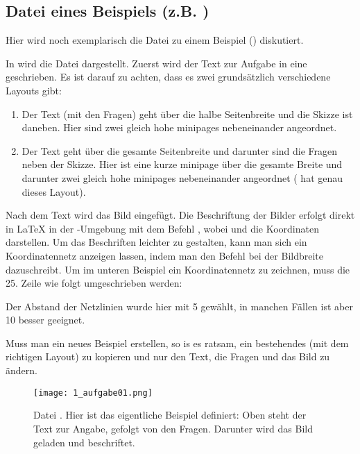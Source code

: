 \subsection{Datei eines Beispiels (z.B. ) }

Hier wird noch exemplarisch die Datei zu einem Beispiel
() diskutiert.

In  wird die Datei  dargestellt.
Zuerst wird der Text zur Aufgabe in eine 
geschrieben. Es ist darauf zu achten, dass es zwei grundsätzlich verschiedene 
Layouts gibt:

\begin {enumerate}
 \item Der Text (mit den Fragen) geht über die halbe Seitenbreite und die 
   Skizze ist daneben. Hier sind zwei gleich hohe minipages nebeneinander
   angeordnet.
 \item Der Text geht über die gesamte Seitenbreite und darunter sind die Fragen
   neben der Skizze. Hier ist eine kurze minipage über die gesamte Breite und
   darunter zwei gleich hohe minipages nebeneinander angeordnet
   ( hat genau dieses Layout).
\end{enumerate}

Nach dem Text wird das Bild eingefügt. Die Beschriftung der Bilder erfolgt 
direkt in \LaTeX{} in der 
-Umgebung mit dem Befehl
, wobei  und 
die Koordinaten darstellen. Um das Beschriften leichter zu gestalten, kann man
sich ein Koordinatennetz anzeigen lassen, indem man den Befehl 
 bei der Bildbreite dazuschreibt.
Um im unteren Beispiel ein Koordinatennetz zu zeichnen, muss die 25. Zeile wie
folgt umgeschrieben werden:
\begin{center}
\end{center}
Der Abstand der Netzlinien wurde hier mit 5 gewählt, in manchen Fällen ist aber
10 besser geeignet.

Muss man ein neues Beispiel erstellen, so is es ratsam, ein bestehendes (mit dem
richtigen Layout) zu kopieren und nur den Text, die Fragen und das Bild 
zu ändern.

\begin{figure}[htbp]
  \texttt{[image: 1\_aufgabe01.png]}
  \caption{Datei . Hier ist das eigentliche Beispiel
    definiert: Oben steht der Text zur Angabe, gefolgt von den Fragen. Darunter
    wird das Bild geladen und beschriftet.}
  \label{fig:aufgabe01}
\end{figure}

